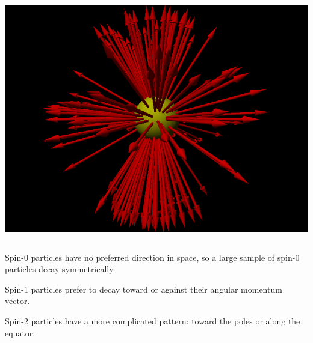 \documentclass[compress]{beamer}
\begin{document}
\begin{frame}
\begin{columns}
\includegraphics[width=\linewidth]{spin2.png}
\end{columns}

\vfill
Spin-0 particles have no preferred direction in space, so a large sample of spin-0 particles decay symmetrically.

\vfill
Spin-1 particles prefer to decay toward or against their angular momentum vector.

\vfill
Spin-2 particles have a more complicated pattern: toward the poles or along the equator.
\end{frame}
\end{document}
